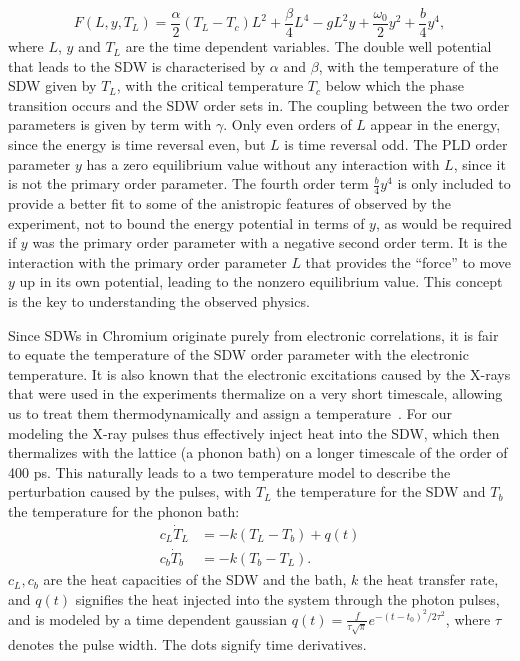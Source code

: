 \begin{equation}
	\label{eq:Cr_landau}
	F(L, y, T_L) = \frac{\alpha}{2}(T_L - T_c) L^2 + \frac{\beta}{4} L^4 - g L^2 y + \frac{\omega_0}{2} y^2 + \frac{b}{4} y^4,
\end{equation}
where $L$, $y$ and $T_L$ are the time dependent variables.
The double well potential that leads to the SDW is characterised by $\alpha$ and $\beta$, with the temperature of the SDW given by $T_L$, with the critical temperature $T_c$ below which the phase transition occurs and the SDW order sets in. The coupling between the two order parameters is given by term with $\gamma$. Only even orders of $L$ appear in the energy, since the energy is time reversal even, but $L$ is time reversal odd. The PLD order parameter $y$ has a zero equilibrium value without any interaction with $L$, since it is not the primary order parameter. The fourth order term $\frac{b}{4}y^4$ is only included to provide a better fit to some of the anistropic features of observed by the experiment, not to bound the energy potential in terms of $y$, as would be required if $y$ was the primary order parameter with a negative second order term.
It is the interaction with the primary order parameter $L$ that provides the ``force'' to move $y$ up in its own potential, leading to the nonzero equilibrium value. This concept is the key to understanding the observed physics.

Since SDWs in Chromium originate purely from electronic correlations, it is fair to equate the temperature of the SDW order parameter with the electronic temperature.
It is also known that the electronic excitations caused by the X-rays that were used in the experiments thermalize on a very short timescale, allowing us to treat them thermodynamically and assign a temperature~\cite{Nicholson2016}.
For our modeling the X-ray pulses thus effectively inject heat into the SDW, which then thermalizes with the lattice (a phonon bath) on a longer timescale of the order of 400 ps.
This naturally leads to a two temperature model to describe the perturbation caused by the pulses, with $T_L$ the temperature for the SDW and $T_b$ the temperature for the phonon bath:
\begin{align}
	c_L \dot{T}_L &= -k(T_L - T_b) + q(t) \\
	c_b \dot{T}_b &= -k(T_b - T_L).
\end{align}
$c_L, c_b$ are the heat capacities of the SDW and the bath, $k$ the heat transfer rate, and $q(t)$ signifies the heat injected into the system through the photon pulses, and is modeled by a time dependent gaussian $q(t) = \frac{f}{\tau \sqrt{\pi}} e^{-(t-t_0)^2/2\tau^2}$, where $\tau$ denotes the pulse width. The dots signify time derivatives.


